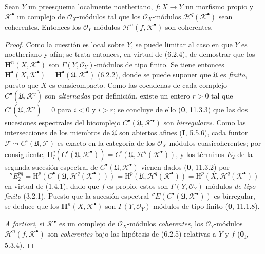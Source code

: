 \begin{proposition}[6.2.5]
Sean $Y$ un preesquema localmente noetheriano, $f:X\to Y$ un morfismo propio
y $\mathscr K^\bullet$ un complejo de $\mathscr O_X$-módulos tal que los
$\mathscr O_X$-módulos $\mathscr H^q(\mathscr K^\bullet)$ sean coherentes.
Entonces los $\mathscr O_Y$-módulos $\mathscr H^n(f,\mathscr K^\bullet)$ son
coherentes.
\end{proposition}

\begin{proof}
Como la cuestión es local sobre $Y$, se puede limitar al caso en que $Y$ es
noetheriano y afín; se trata entonces, en virtud de (6.2.4), de demostrar que
los $\mathbf H^n(X,\mathscr K^\bullet)$ son
$\Gamma(Y,\mathscr O_Y)$-módulos de tipo finito. Se tiene entonces
$\mathbf H^\bullet(X,\mathscr K^\bullet)=
\mathbf H^\bullet(\mathfrak U,\mathscr K^\bullet)$ (6.2.2), donde se puede
suponer que $\mathfrak U$ es \emph{finito}, puesto que $X$ es cuasicompacto. Como las
cocadenas de cada complejo $C^\bullet(\mathfrak U,\mathscr K^j)$ son
\emph{alternadas} por definición, existe un entero $r>0$ tal que
$C^i(\mathfrak U,\mathscr K^j)=0$ para $i<0$ y $i>r$; se concluye de ello
(\textbf 0, 11.3.3) que las dos sucesiones espectrales del bicomplejo
$C^\bullet(\mathfrak U,\mathscr K^\bullet)$ son \emph{birregulares}. Como las
intersecciones de los miembros de $\mathfrak U$ son abiertos afines
(\textbf I, 5.5.6), cada funtor
$\mathscr F\leadsto C^i(\mathfrak U,\mathscr F)$ es exacto en la categoría de
los $\mathscr O_X$-módulos cuasicoherentes; por consiguiente,
$\mathrm H_I^q(C^i(\mathfrak U,\mathscr K^\bullet))
=C^i(\mathfrak U,\mathscr H^q(\mathscr K^\bullet))$, y los términos
$E_2$ de la segunda sucesión espectral de
$C^\bullet(\mathfrak U,\mathscr K^\bullet)$ vienen dados (\textbf 0, 11.3.2) por
\[
  ''E_2^{pq}
  =\mathrm H^p(C^\bullet(\mathfrak U,\mathscr H^q(\mathscr K^\bullet)))
  =\mathrm H^p(\mathfrak U,\mathscr H^q(\mathscr K^\bullet))
  =\mathrm H^p(X,\mathscr H^q(\mathscr K^\bullet))
\]
en virtud de (1.4.1); dado que $f$ es propio, estos son
$\Gamma(Y,\mathscr O_Y)$-módulos \emph{de tipo finito} (3.2.1). Puesto que la sucesión
espectral $''E(C^\bullet(\mathfrak U,\mathscr K^\bullet))$ es birregular, se
deduce que los $\mathbf H^n(X,\mathscr K^\bullet)$ son
$\Gamma(Y,\mathscr O_Y)$-módulos de tipo finito (\textbf 0, 11.1.8).

\emph{A fortiori}, si $\mathscr K^\bullet$ es un complejo de
$\mathscr O_X$-módulos \emph{coherentes}, los $\mathscr O_Y$-módulos
$\mathscr H^n(f,\mathscr K^\bullet)$ son \emph{coherentes} bajo las hipótesis de
(6.2.5) relativas a $Y$ y $f$ (\textbf{0}\textsubscript{I}, 5.3.4).
\end{proof}

